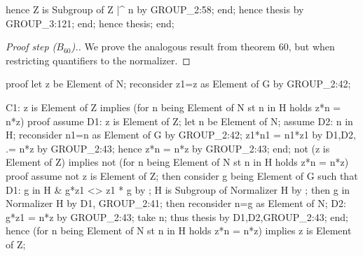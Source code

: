       hence Z is Subgroup of Z |^ n by GROUP_2:58;
    end;
    hence thesis by GROUP_3:121;
  end;
  hence thesis;
end;
\eatline
{}\nwendcode{}\nwdocspar
\begin{proof}[Proof step ($B_{60}$).]
We prove the analogous result from theorem 60, but when restricting
quantifiers to the normalizer.
\end{proof}

\nwenddocs{}\endmoddef\nwstartdeflinemarkup{}\nwenddeflinemarkup
proof
  let z be Element of N;
  reconsider z1=z as Element of G by GROUP_2:42;

  C1: z is Element of Z implies (for n being Element of N st n in H
                                 holds z*n = n*z)
  proof
    assume D1: z is Element of Z;
    let n be Element of N;
    assume D2: n in H;
    reconsider n1=n as Element of G by GROUP_2:42;
    z1*n1 = n1*z1 by D1,D2,
         .= n*z by GROUP_2:43;
    hence z*n = n*z by GROUP_2:43;
  end;
  not (z is Element of Z) implies not (for n being Element of N st n in H
  holds z*n = n*z)
  proof
    assume not z is Element of Z;
    then consider g being Element of G such that
    D1: g in H & g*z1 <> z1 * g by ;
    H is Subgroup of Normalizer H by ;
    then g in Normalizer H by D1, GROUP_2:41;
    then reconsider n=g as Element of N;
    D2: g*z1 = n*z by GROUP_2:43;
    take n;
    thus thesis by D1,D2,GROUP_2:43;
  end;
  hence (for n being Element of N st n in H holds z*n = n*z) implies
  z is Element of Z;

